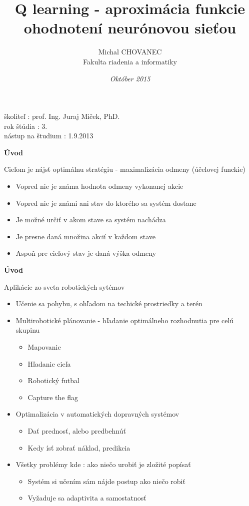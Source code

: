 \documentclass[xcolor=dvipsnames]{beamer}
\title{\bf Q learning - aproximácia funkcie ohodnotení neurónovou sieťou}
\author{Michal CHOVANEC \\Fakulta riadenia a informatiky}
\date[EURP]{\it Október 2015}
\begin{document}
\begin{frame}
\titlepage
školiteľ : prof. Ing. Juraj Miček, PhD. \\
rok štúdia : 3. \\
nástup na študium : 1.9.2013 \\
\end{frame}

\begin{frame}{\bf Úvod}

Cieľom je nájsť optimálnu stratégiu - maximalizácia odmeny (účelovej funckie)

\begin{itemize}
\item{Vopred nie je známa hodnota odmeny vykonanej akcie}
\item{Vopred nie je známi ani stav do ktorého sa systém dostane}
\item{Je možné určiť v akom stave sa systém nachádza}
\item{Je presne daná množina akcií v každom stave}
\item{Aspoň pre cieľový stav je daná výška odmeny}
\end{itemize}

\end{frame}

\begin{frame}{\bf Úvod}

Aplikácie zo sveta robotických sytémov

\begin{itemize}
\item{Učenie sa pohybu, s ohľadom na techické prostriedky a terén}
\item{Multirobotické plánovanie - hľadanie optimálneho rozhodnutia pre celú skupinu}
    \begin{itemize}
    \item{Mapovanie}
    \item{Hľadanie cieľa}
    \item{Robotický futbal}
    \item{Capture the flag}
    \end{itemize}
\item{Optimalizácia v automatických dopravných systémov}
    \begin{itemize}
    \item{Dať prednosť, alebo predbehnúť}
    \item{Kedy ísť zobrať náklad, predikcia}
    \end{itemize}
\item{Všetky problémy kde : ako niečo urobiť je zložité popísať}
    \begin{itemize}
    \item{Systém si učením sám nájde postup ako niečo robiť}
    \item{Vyžaduje sa adaptivita a samostatnosť}
    \end{itemize}
\end{itemize}

\end{frame}
\end{document}
